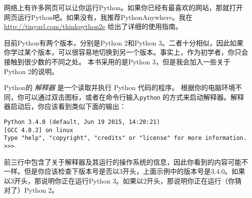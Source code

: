 网络上有许多网页可以让你运行Python。如果你已经有最喜欢的网站，那就打开网页运行Python吧。如果没有，我推荐PythonAnywhere。我在 \href{http://tinyurl.com/thinkpython2e}{http://tinyurl.com/thinkpython2e} 给出了详细的使用指南。
\label{python_anywhere}


目前Python有两个版本，分别是Python 2和Python 3。二者十分相似，因此如果你学过某个版本，可以很容易地切换到另一个版本。事实上，作为初学者，你只会接触到很少数的不同之处。
本书采用的是Python 3，但是我会加入一些关于Python 2的说明。


Python的 {\em 解释器} 是一个读取并执行 Python 代码的程序。  根据你的电脑环境不同，你可以通过双击图标，或者在命令行输入\lstinline{python} 的方式来启动解释器。解释器启动后，你应该看到类似下面的输出：
  

\begin{lstlisting}
Python 3.4.0 (default, Jun 19 2015, 14:20:21)
[GCC 4.8.2] on linux
Type "help", "copyright", "credits" or "license" for more information.
>>>
\end{lstlisting}

%

前三行中包含了关于解释器及其运行的操作系统的信息，因此你看到的内容可能不一样。但是你应该检查下版本号是否以3开头，上面示例中的版本号是3.4.0。如果以3开头，那说明你正在运行Python 3。如果以2开头，那说明你正在运行（你猜对了）Python 2。


